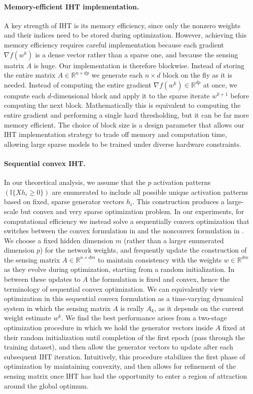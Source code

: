 \documentclass{article} %
\newcommand{\n}{\ensuremath{n}}
\newcommand{\m}{\ensuremath{m}}
\newcommand{\p}{\ensuremath{p}}
\newcommand{\datadim}{\ensuremath{d}}
\newcommand{\X}{\ensuremath{X}}
\newcommand{\w}{\ensuremath{w}}
\newcommand{\h}{\ensuremath{h}}
\newcommand{\1}{\ensuremath{{\sf (i)}}}
\newcommand{\2}{\ensuremath{{\sf (ii)}}}
\newcommand{\3}{\ensuremath{{\sf (iii)}}}
\newcommand{\4}{\ensuremath{{\sf (iv)}}}
\newcommand{\5}{\ensuremath{{\sf (v)}}}
\newcommand{\6}{\ensuremath{{\sf (vi)}}}
\newcommand{\R}{\mathbb{R}}
\begin{document}
\paragraph{Memory-efficient IHT implementation.}
A key strength of IHT is its memory efficiency, since only the nonzero weights and their indices need to be stored during optimization. However, achieving this memory efficiency requires careful implementation because each gradient $\nabla f(\w^k)$ is a dense vector rather than a sparse one, and because the sensing matrix $A$ is huge. Our implementation is therefore blockwise. Instead of storing the entire matrix $A \in \R^{\n \times \datadim\p}$ we generate each $\n \times \datadim$ block on the fly as it is needed. Instead of computing the entire gradient $\nabla f(\w^k) \in \R^{\datadim\p}$ at once, we compute each $\datadim$-dimensional block and apply it to the sparse iterate $\w^{k+1}$ before computing the next block. Mathematically this is equivalent to computing the entire gradient and performing a single hard thresholding, but it can be far more memory efficient. The choice of block size is a design parameter that allows our IHT implementation strategy to trade off memory and computation time, allowing large sparse models to be trained under diverse hardware constraints.

\paragraph{Sequential convex IHT.}
In our theoretical analysis, we assume that the $\p$ activation patterns $(\mathbb{I}\{\X\h_i \geq 0\})$ are enumerated to include all possible unique activation patterns based on fixed, sparse generator vectors $\h_i$. This construction produces a large-scale but convex and very sparse optimization problem. In our experiments, for computational efficiency we instead solve a sequentially convex optimization that switches between the convex formulation in  and the nonconvex formulation in . We choose a fixed hidden dimension $\m$ (rather than a larger enumerated dimension $\p$) for the network weights, and frequently update the construction of the sensing matrix $A \in \R^{\n \times \datadim \m}$ to maintain consistency with the weights $\w \in \R^{\datadim\m}$ as they evolve during optimization, starting from a random initialization. In between these updates to $A$ the formulation is fixed and convex, hence the terminology of sequential convex optimization.
We can equivalently view optimization in this sequential convex formulation as a time-varying dynamical system in which the sensing matrix $A$ is really $A_k$, as it depends on the current weight estimate $\w^k$.
We find the best performance arises from a two-stage optimization procedure in which we hold the generator vectors inside $A$ fixed at their random initialization until completion of the first epoch (pass through the training dataset), and then allow the generator vectors to update after each subsequent IHT iteration. Intuitively, this procedure stabilizes the first phase of optimization by maintaining convexity, and then allows for refinement of the sensing matrix once IHT has had the opportunity to enter a region of attraction around the global optimum. 
\end{document}
